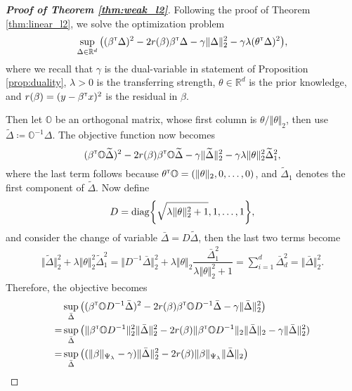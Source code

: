 \documentclass[12pt]{article}
\begin{document}
\begin{proof}[\textbf{Proof of Theorem \ref{thm:weak_l2}}]
    Following the proof of Theorem \ref{thm:linear_l2}, we solve the optimization problem \[
    \sup_{\Delta\in \mathbb{R}^d} \big((\beta^{\scriptscriptstyle \sf T} \Delta)^2-2r(\beta)\beta^{\scriptscriptstyle \sf T} \Delta - \gamma \Vert \Delta\Vert_2^2 - \gamma\lambda (\theta^{\scriptscriptstyle \sf T}\Delta)^2\big),
    \]where we recall that $\gamma$ is the dual-variable in statement of Proposition \ref{prop:duality}, $\lambda>0$ is the transferring strength, $\theta\in\mathbb{R}^d$ is the prior knowledge, and $r(\beta) = (y-\beta^{\scriptscriptstyle \sf T} x)^2$ is the residual in $\beta$. 

    Then let $\mathbb{O}$ be an orthogonal matrix, whose first column is $\theta/\Vert \theta\Vert_2$, then use $\widetilde{\Delta} \coloneqq \mathbb{O}^{-1}\Delta.$ The objective function now becomes \[
    (\beta^{\scriptscriptstyle \sf T} \mathbb{O}\widetilde{\Delta})^2 - 2r(\beta) \beta^{\scriptscriptstyle \sf T} \mathbb{O}\widetilde{\Delta} -\gamma\Vert \widetilde{\Delta}\Vert_2^2-\gamma \lambda\Vert\theta\Vert_2^2\widetilde{\Delta}_1^2,
    \]where the last term follows because $\theta^{\scriptscriptstyle \sf T} \mathbb{O} = (\Vert\theta\Vert_2,0,\ldots,0)$, and $\widetilde{\Delta}_1$ denotes the first component of $\widetilde{\Delta}$. Now define \[
    D = {\rm diag}{\left\{\sqrt{\lambda\Vert \theta\Vert_2^2+1},1,\ldots,1\right\}},
    \]and consider the change of variable $\bar{\Delta} = D\widetilde{\Delta}$, then the last two terms become
    \begin{align*}
    \Vert \widetilde{\Delta}\Vert_2^2 + \lambda\Vert\theta\Vert_2^2\widetilde{\Delta}_1^2=
    \Vert D^{-1}\bar{\Delta}\Vert_2^2 + \lambda \Vert\theta\Vert_2\dfrac{\bar{\Delta}_1^2}{{\lambda\Vert\theta\Vert_2^2+1}}
    =\sum_{i=1}^d \bar{\Delta}_d^2 = \Vert\bar{\Delta}\Vert_2^2.
    \end{align*}
    Therefore, the objective becomes \begin{align*}
        &\sup_{\bar{\Delta}} \big((\beta^{\scriptscriptstyle \sf T} \mathbb{O}D^{-1}\bar{\Delta})^2 - 2r(\beta)\beta^{\scriptscriptstyle \sf T}\mathbb{O}D^{-1}\bar{\Delta} - \gamma \Vert\bar{\Delta}\Vert_2^2\big) \\
        =&\sup_{\bar{\Delta}}\big(\Vert \beta^{\scriptscriptstyle \sf T} \mathbb{O}D^{-1}\Vert_2^2\Vert\bar{\Delta}\Vert_2^2 -2r(\beta)\Vert \beta^{\scriptscriptstyle \sf T} \mathbb{O}D^{-1}\Vert_2 \Vert\bar{\Delta}\Vert_2 - \gamma\Vert\bar{\Delta}\Vert_2^2)\\
        =&\sup_{\bar{\Delta}}\big( (\Vert \beta\Vert_{\Psi_\lambda} - \gamma)\Vert\bar{\Delta}\Vert_2^2 - 2r(\beta) \Vert\beta\Vert_{\Psi_\lambda} \Vert\bar{\Delta}\Vert_2\big)
    \end{align*}

\end{proof}
\end{document}
